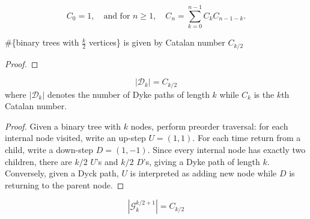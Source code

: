 \begin{definition}
    \notready
    \label{def:Catalan_number}
  \[C_0 = 1, \quad \text{and for } n \geq 1, \quad C_n = \sum_{k=0}^{n-1} C_k C_{n-1-k}.\]
\end{definition}


\begin{lemma}
    \notready
    \label{lem:binary_tree_Catalan_number}
  \#\{binary trees with $\frac{k}{2}$ vertices\} is given by Catalan number $C_{k / 2}$
  \begin{proof}
    \notready
  \end{proof}
\end{lemma}


\begin{proposition}
    \notready
    \label{prop:Catalan_Dyck_samecardinality}
  \[|\mathcal{D}_k| = C_{k/2} \] where $|\mathcal{D}_k|$ denotes the number of Dyke paths of length $k$ while
  $C_k$ is the $k$th Catalan number.
  \begin{proof}
    \notready
    Given a binary tree with $k$ nodes, perform preorder traversal: for each internal node visited, write
    an up-step \(U = (1,1)\). For each time return from a child, write a down-step \(D = (1,-1)\).
    Since every internal node has exactly two children, there are \(k/2\) \(U\)'s and \(k/2\) \(D\)'s,
    giving a Dyke path of length \(k\). Conversely, given a Dyck path, $U$ is interpreted as adding new node
    while $D$ is returning to the parent node.
  \end{proof}
\end{proposition}

\begin{proposition}
    \notready
    \label{prop:graph_Catalan_number}
  \[|\mathcal{G}^{k/2 + 1}_k| = C_{k/2}\]
\end{proposition}



%
%
%
%
%
%
%
%


